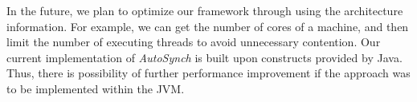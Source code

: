 \documentclass[preprint]{sigplanconf}
\begin{document}
In the future, we plan to optimize our framework through using the architecture
information. For example, we can get the number of cores of a machine, and
then limit the number of executing threads to avoid unnecessary contention. Our 
current implementation of {\em AutoSynch} is built upon constructs provided 
by Java. Thus, there is possibility of further performance improvement if the 
approach was to be implemented within the JVM. 








\appendix
\end{document}
